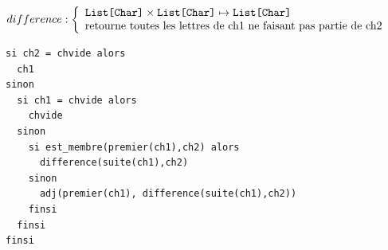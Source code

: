 \documentclass[10pt]{article}\usepackage[correction,nu]{esial}
\begin{document}
\begin{Question}
  $difference: \left\{
    \begin{array}{l}
      \text{\texttt{List[Char]}}\times \text{\texttt{List[Char]}}\mapsto \text{\texttt{List[Char]}}\\
      \text{retourne toutes les lettres de ch1 ne faisant
        pas partie de ch2}
    \end{array}\right.$    
\end{Question}
\begin{Reponse}
  \begin{Verbatim}[label=difference(ch1\quotesinglbase ch2)]
si ch2 = chvide alors
  ch1
sinon 
  si ch1 = chvide alors
    chvide
  sinon
    si est_membre(premier(ch1),ch2) alors
      difference(suite(ch1),ch2)
    sinon
      adj(premier(ch1), difference(suite(ch1),ch2))
    finsi
  finsi
finsi    
  \end{Verbatim}
\end{Reponse}
\end{document}
